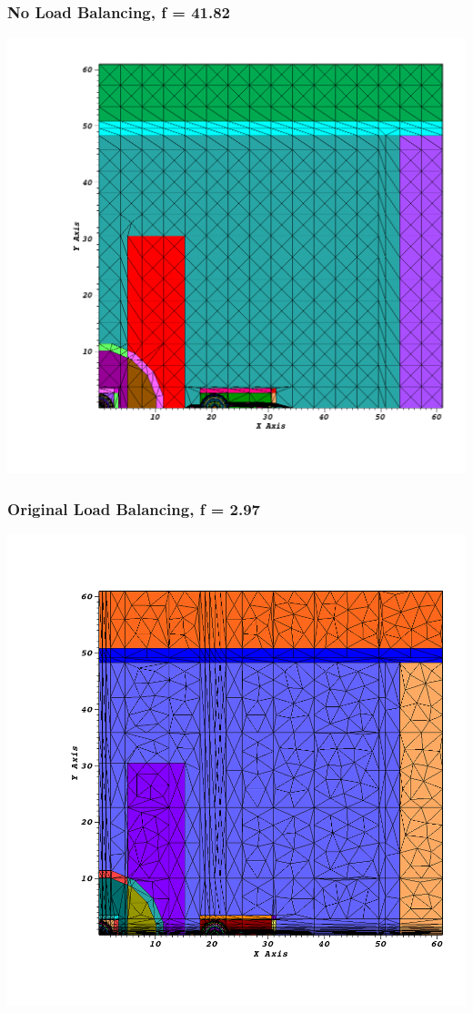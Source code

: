 \documentclass[xcolor={usenames,dvipsnames,svgnames,table}]{beamer}
\begin{document}
\begin{frame}[t]\frametitle{No Load Balancing, f = 41.82}
\centering
\includegraphics[scale=0.25]{figures/im12d_nolb.png}
\end{frame}

\begin{frame}[t]\frametitle{Original Load Balancing, f = 2.97}
\centering
\includegraphics[scale=0.22]{figures/im12d_oldlb.png}
\end{frame}
\end{document}
